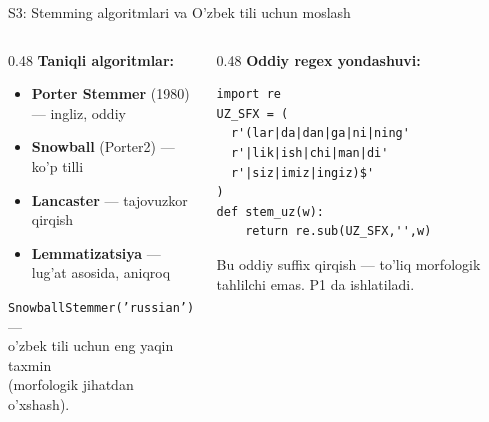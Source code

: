 \documentclass[aspectratio=169,11pt]{beamer}
\begin{document}
\begin{frame}[fragile]{S3: Stemming algoritmlari va O'zbek tili uchun moslash}
  \begin{columns}[T]
    \begin{column}{0.48\textwidth}
      \textbf{Taniqli algoritmlar:}\\[4pt]
      \small
      \begin{itemize}\setlength\itemsep{3pt}
        \item \textbf{Porter Stemmer} (1980) --- ingliz, oddiy
        \item \textbf{Snowball} (Porter2) --- ko'p tilli
        \item \textbf{Lancaster} --- tajovuzkor qirqish
        \item \textbf{Lemmatizatsiya} --- lug'at asosida, aniqroq
      \end{itemize}
      \vspace{4pt}
      \footnotesize
      \texttt{SnowballStemmer('russian')} ---\\
      o'zbek tili uchun eng yaqin taxmin\\
      (morfologik jihatdan o'xshash).
    \end{column}
    \begin{column}{0.48\textwidth}
      \textbf{Oddiy regex yondashuvi:}\\[3pt]
\begin{lstlisting}[numbers=none,frame=single,
                   basicstyle=\ttfamily\tiny]
import re
UZ_SFX = (
  r'(lar|da|dan|ga|ni|ning'
  r'|lik|ish|chi|man|di'
  r'|siz|imiz|ingiz)$'
)
def stem_uz(w):
    return re.sub(UZ_SFX,'',w)
\end{lstlisting}
      \vspace{3pt}
      \footnotesize
      Bu oddiy suffix qirqish ---
      to'liq morfologik tahlilchi emas.
      P1 da ishlatiladi.
    \end{column}
  \end{columns}
\end{frame}
\end{document}
